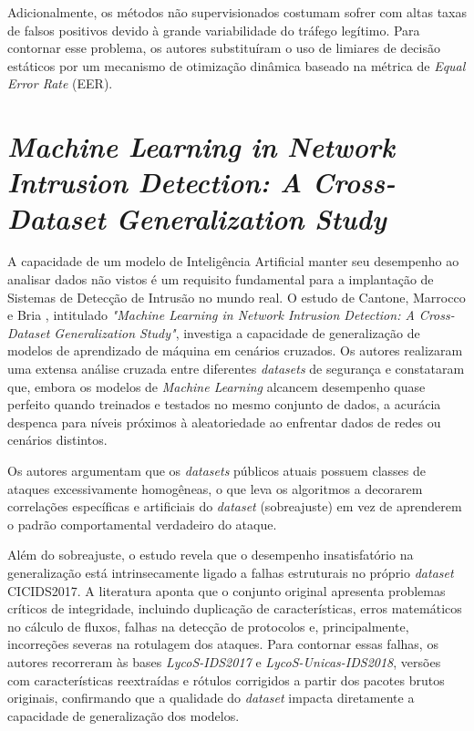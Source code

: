 Adicionalmente, os métodos não supervisionados costumam sofrer com altas taxas de falsos positivos devido à grande variabilidade do tráfego legítimo. Para contornar esse problema, os autores substituíram o uso de limiares de decisão estáticos por um mecanismo de otimização dinâmica baseado na métrica de \textit{Equal Error Rate} (EER).

\section{\textit{Machine Learning in Network Intrusion Detection: A Cross-Dataset Generalization Study}}

A capacidade de um modelo de Inteligência Artificial manter seu desempenho ao analisar dados não vistos é um requisito fundamental para a implantação de Sistemas de Detecção de Intrusão no mundo real. O estudo de Cantone, Marrocco e Bria \cite{cantone2024}, intitulado \textit{"Machine Learning in Network Intrusion Detection: A Cross-Dataset Generalization Study"}, investiga a capacidade de generalização de modelos de aprendizado de máquina em cenários cruzados. Os autores realizaram uma extensa análise cruzada entre diferentes \textit{datasets} de segurança e constataram que, embora os modelos de \textit{Machine Learning} alcancem desempenho quase perfeito quando treinados e testados no mesmo conjunto de dados, a acurácia despenca para níveis próximos à aleatoriedade ao enfrentar dados de redes ou cenários distintos.

Os autores argumentam que os \textit{datasets} públicos atuais possuem classes de ataques excessivamente homogêneas, o que leva os algoritmos a decorarem correlações específicas e artificiais do \textit{dataset} (sobreajuste) em vez de aprenderem o padrão comportamental verdadeiro do ataque. 

Além do sobreajuste, o estudo revela que o desempenho insatisfatório na generalização está intrinsecamente ligado a falhas estruturais no próprio \textit{dataset} CICIDS2017. A literatura aponta que o conjunto original apresenta problemas críticos de integridade, incluindo duplicação de características, erros matemáticos no cálculo de fluxos, falhas na detecção de protocolos e, principalmente, incorreções severas na rotulagem dos ataques. Para contornar essas falhas, os autores recorreram às bases \textit{LycoS-IDS2017} e \textit{LycoS-Unicas-IDS2018}, versões com características reextraídas e rótulos corrigidos a partir dos pacotes brutos originais, confirmando que a qualidade do \textit{dataset} impacta diretamente a capacidade de generalização dos modelos.

